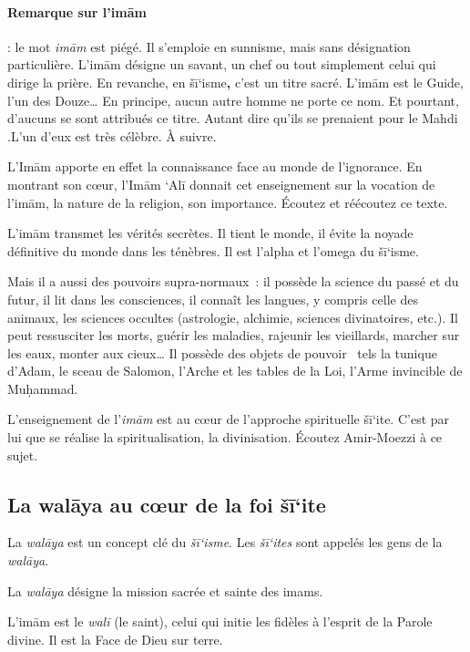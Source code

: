 \paragraph{Remarque sur l'imām~}: le mot \emph{imām}
est piégé. Il s'emploie en sunnisme, mais sans désignation particulière.
L'imām désigne un savant, un chef ou tout simplement celui qui dirige la
prière. En revanche, en šī`isme\textbf{,} c'est un titre sacré. L'imām
est le Guide, l'un des Douze\ldots{} En principe, aucun autre homme ne
porte ce nom. Et pourtant, d'aucuns se sont attribués ce titre. Autant
dire qu'ils se prenaient pour le Mahdi .L'un d'eux est très célèbre. À
suivre.

L'Imām apporte en effet la connaissance face au monde de l'ignorance. En
montrant son cœur, l'Imām `Alī donnait cet enseignement sur la vocation
de l'imām, la nature de la religion, son importance. Écoutez et
réécoutez ce texte.


L'imām transmet les vérités secrètes. Il tient le monde, il évite la
noyade définitive du monde dans les ténèbres. Il est l'alpha et l'omega
du šī`isme.

Mais il a aussi des pouvoirs supra-normaux~: il possède la science du
passé et du futur, il lit dans les consciences, il connaît les langues,
y compris celle des animaux, les sciences occultes (astrologie,
alchimie, sciences divinatoires, etc.). Il peut ressusciter les morts,
guérir les maladies, rajeunir les vieillards, marcher sur les eaux,
monter aux cieux\ldots{} Il possède des objets de pouvoir~ tels la
tunique d'Adam, le sceau de Salomon, l'Arche et les tables de la Loi,
l'Arme invincible de Muḥammad.

L'enseignement de l'\emph{imām} est au cœur de l'approche spirituelle
šī`ite. C'est par lui que se réalise la spiritualisation, la
divinisation. Écoutez Amir-Moezzi à ce sujet.

 
\subsection{La walāya au cœur de la foi šī`ite
} 


La \emph{walāya} est un concept clé du \emph{šī`isme}. Les
\emph{šī`ites} sont appelés les gens de la \emph{walāya}.\\
\begin{Def}[walāya]
La \emph{walāya} désigne la mission sacrée et sainte des imams.

L'imām est le \emph{walī} (le saint), celui qui initie les fidèles à
l'esprit de la Parole divine. Il est la Face de Dieu sur terre.

\end{Def}



